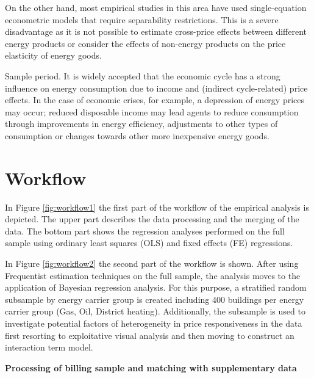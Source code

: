 \documentclass[12pt,twoside]{reedthesis}
\begin{document}
On the other hand, most empirical studies in this area have used single-equation econometric models that require separability restrictions. This is a severe disadvantage as it is not possible to estimate cross-price effects between different energy products or consider the effects of non-energy products on the price elasticity of energy goods.

Sample period. It is widely accepted that the economic cycle has a strong influence on energy consumption due to income and (indirect cycle-related) price effects. In the case of economic crises, for example, a depression of energy prices may occur; reduced disposable income may lead agents to reduce consumption through improvements in energy efficiency, adjustments to other types of consumption or changes towards other more inexpensive energy goods.

\hypertarget{workflow}{%
\section{Workflow}\label{workflow}}

In Figure \ref{fig:workflow1} the first part of the workflow of the empirical analysis is depicted. The upper part describes the data processing and the merging of the data. The bottom part shows the regression analyses performed on the full sample using ordinary least squares (OLS) and fixed effects (FE) regressions.

In Figure \ref{fig:workflow2} the second part of the workflow is shown. After using Frequentist estimation techniques on the full sample, the analysis moves to the application of Bayesian regression analysis. For this purpose, a stratified random subsample by energy carrier group is created including 400 buildings per energy carrier group (Gas, Oil, District heating). Additionally, the subsample is used to investigate potential factors of heterogeneity in price responsiveness in the data first resorting to exploitative visual analysis and then moving to construct an interaction term model.

\textbf{Processing of billing sample and matching with supplementary data}
\end{document}
